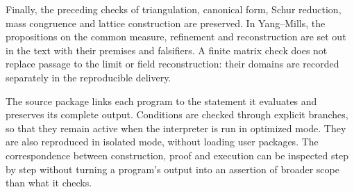 Finally, the preceding checks of triangulation,
canonical form, Schur reduction, mass
congruence and lattice construction are preserved. In Yang--Mills, the
propositions on the common measure, refinement and reconstruction
are set out in the text with their premises and falsifiers. A
finite matrix check does not replace passage to the limit
or field reconstruction: their domains are recorded
separately in the reproducible delivery.

The source package links each program to the statement
it evaluates and preserves its complete output. Conditions are
checked through explicit branches, so that they
remain active when the interpreter is run in
optimized mode. They are also reproduced in isolated mode, without
loading user packages. The correspondence between
construction, proof and execution can be inspected
step by step without turning a program's output into
an assertion of broader scope than what it checks.

